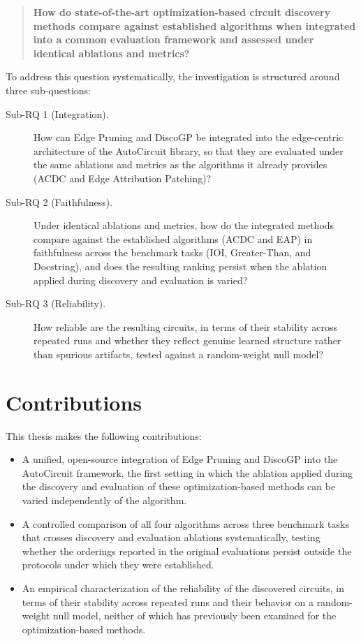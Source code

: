 \begin{quote}
  \textbf{How do state-of-the-art optimization-based circuit discovery methods compare against established algorithms when integrated into a common evaluation framework and assessed under identical ablations and metrics?}
\end{quote}

\noindent To address this question systematically, the investigation is structured around three sub-questions:

\begin{description}
  \item[Sub-RQ 1 (Integration).] How can Edge Pruning and DiscoGP be integrated into the edge-centric architecture of the AutoCircuit library, so that they are evaluated under the same ablations and metrics as the algorithms it already provides (ACDC and Edge Attribution Patching)?
  \item[Sub-RQ 2 (Faithfulness).] Under identical ablations and metrics, how do the integrated methods compare against the established algorithms (ACDC and EAP) in faithfulness across the benchmark tasks (IOI, Greater-Than, and Docstring), and does the resulting ranking persist when the ablation applied during discovery and evaluation is varied?
  \item[Sub-RQ 3 (Reliability).] How reliable are the resulting circuits, in terms of their stability across repeated runs and whether they reflect genuine learned structure rather than spurious artifacts, tested against a random-weight null model?
\end{description}

\section{Contributions}\label{sec:contributions}

This thesis makes the following contributions:

\begin{itemize}
  \item A unified, open-source integration of Edge Pruning and DiscoGP into the AutoCircuit framework, the first setting in which the ablation applied during the discovery and evaluation of these optimization-based methods can be varied independently of the algorithm.
  \item A controlled comparison of all four algorithms across three benchmark tasks that crosses discovery and evaluation ablations systematically, testing whether the orderings reported in the original evaluations persist outside the protocols under which they were established.
  \item An empirical characterization of the reliability of the discovered circuits, in terms of their stability across repeated runs and their behavior on a random-weight null model, neither of which has previously been examined for the optimization-based methods.
\end{itemize}

